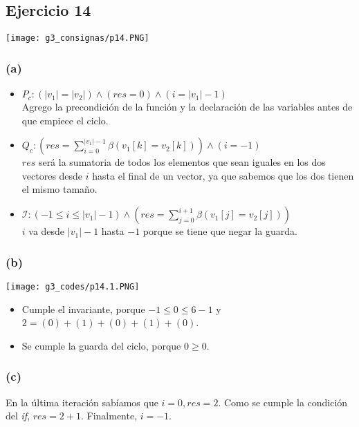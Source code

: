 \documentclass[12 pt]{article}
\begin{document}
\subsection*{Ejercicio 14}
    \begin{center}
        \texttt{[image: g3\_consignas/p14.PNG]}
    \end{center}
    \subsubsection*{(a)}
        \begin{itemize}
            \item $P_{c}: (|v_{1}| = |v_{2}|) \wedge (res = 0) \wedge (i = |v_{1}|-1)$
            \\
            Agrego la precondición de la función y la declaración de las variables antes de que empiece el ciclo.
            \item $Q_{c}: \left(res = \sum^{|v_{1}|-1}_{i = 0}\beta(v_{1}[k] = v_{2}[k])\right) \wedge (i = -1)$
            \\
            $res$ será la sumatoria de todos los elementos que sean iguales en los dos vectores desde $i$ hasta el final de un vector, ya que sabemos que los dos tienen el mismo tamaño. 
            \item $\mathcal{I}: (-1 \leq i \leq |v_{1}|-1) \wedge \left(res = \sum^{i+1}_{j=0}\beta(v_{1}[j] = v_{2}[j])\right)$
            \\
            $i$ va desde $|v_{1}|-1$ hasta $-1$ porque se tiene que negar la guarda.
        \end{itemize}
    \subsubsection*{(b)}
        \begin{center}
            \texttt{[image: g3\_codes/p14.1.PNG]}
        \end{center}
        \begin{itemize}
            \item Cumple el invariante, porque $-1 \leq 0 \leq 6 - 1$ y $2 = (0)+(1)+(0)+(1)+(0)$.
            \item Se cumple la guarda del ciclo, porque $0 \geq 0$.
        \end{itemize}
    \subsubsection*{(c)}
        En la última iteración sabíamos que $i = 0, res = 2$. Como se cumple la condición del \textit{if}, $res = 2+1$. Finalmente, $i = -1$.
\end{document}
